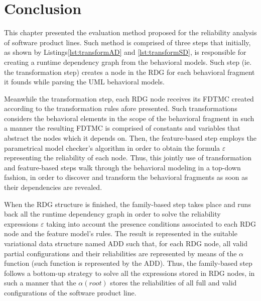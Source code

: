\section{Conclusion \label{sec:featureFamilyBasedConclusion}}

This chapter presented the evaluation method proposed for the reliability analysis of software product lines. Such method is comprised of three steps that initially, as shown by Listings\ref{lst:transformAD} and \ref{lst:transformSD}, is responsible for creating a runtime dependency graph from the behavioral models. Such step (ie. the transformation step) creates a node in the RDG for each behavioral fragment it founds while parsing the UML behavioral models. 

Meanwhile the transformation step, each RDG node receives its FDTMC created
according to the transformation rules afore presented. Such transformations
considers the behavioral elements in the scope of the behavioral fragment in
such a manner the resulting FDTMC is comprised of constants and variables that
abstract the nodes which it depends on. Then, the feature-based step employs
the parametrical model checker's algorithm in order to obtain the formula $\varepsilon$
representing the reliability of each node. Thus, this jointly use of
transformation and feature-based steps walk through the behavioral modeling in
a top-down fashion, in order to discover and transform the behavioral fragments
as soon as their dependencies are revealed.

When the RDG structure is finished, the family-based step takes place and runs
back all the runtime dependency graph in order to solve the reliability
expressions $\varepsilon$ taking into account the presence conditions
associated to each RDG node and the feature model's rules. The result is
represented in the suitable variational data structure named ADD such that, for
each RDG node, all valid partial configurations and their reliabilities are
represented by means of the $\alpha$ function (such function is represented by
the ADD). Thus, the family-based step follows a bottom-up strategy to solve all the expressions stored in RDG nodes, in such a manner that the $\alpha(root)$ stores the reliabilities of all full and valid configurations of the software product line.









